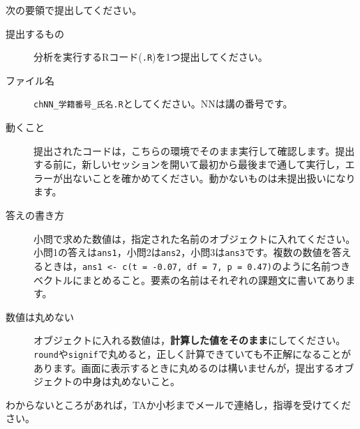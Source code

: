 次の要領で提出してください。
\begin{description}
	\item[提出するもの] 分析を実行するRコード(\texttt{.R})を1つ提出してください。
	\item[ファイル名] \texttt{chNN\_学籍番号\_氏名.R}としてください。NNは講の番号です。
	\item[動くこと] 提出されたコードは，こちらの環境でそのまま実行して確認します。提出する前に，新しいセッションを開いて最初から最後まで通して実行し，エラーが出ないことを確かめてください。動かないものは未提出扱いになります。
	\item[答えの書き方] 小問で求めた数値は，指定された名前のオブジェクトに入れてください。小問1の答えは\verb|ans1|，小問2は\verb|ans2|，小問3は\verb|ans3|です。複数の数値を答えるときは，\verb|ans1 <- c(t = -0.07, df = 7, p = 0.47)|のように名前つきベクトルにまとめること。要素の名前はそれぞれの課題文に書いてあります。
	\item[数値は丸めない] オブジェクトに入れる数値は，\textbf{計算した値をそのまま}にしてください。\verb|round|や\verb|signif|で丸めると，正しく計算できていても不正解になることがあります。画面に表示するときに丸めるのは構いませんが，提出するオブジェクトの中身は丸めないこと。
\end{description}
わからないところがあれば，TAか小杉までメールで連絡し，指導を受けてください。

